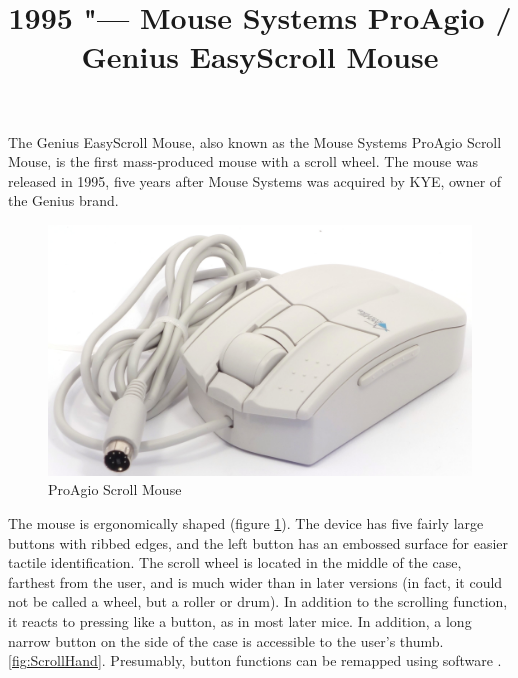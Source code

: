 \documentclass[11pt, a4paper]{article}
\begin{document}
\title{1995 "--- Mouse Systems ProAgio / Genius EasyScroll Mouse}
\date{}
\maketitle

The Genius EasyScroll Mouse, also known as the Mouse Systems ProAgio Scroll Mouse, is the first mass-produced mouse with a scroll wheel. The mouse was released in 1995, five years after Mouse Systems was acquired by KYE, owner of the Genius brand.

\begin{figure}[h]
    \centering
    \includegraphics[scale=0.5]{1995_pro_agio_scroll_mouse/pic_30.jpg}
    \caption{ProAgio Scroll Mouse}
    \label{fig:ScrollPic}
\end{figure}


The mouse is ergonomically shaped (figure \ref{fig:ScrollPic}). The device has five fairly large buttons with ribbed edges, and the left button has an embossed surface for easier tactile identification. The scroll wheel is located in the middle of the case, farthest from the user, and is much wider than in later versions (in fact, it could not be called a wheel, but a roller or drum). In addition to the scrolling function, it reacts to pressing like a button, as in most later mice. In addition, a long narrow button on the side of the case is accessible to the user's thumb. \ref{fig:ScrollHand}. Presumably, button functions can be remapped using software \cite{yt}.
\end{document}
